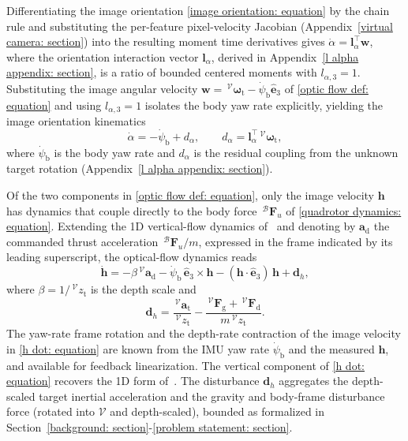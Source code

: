 \documentclass{IEEEtaes}
\begin{document}
Differentiating the image orientation \eqref{image orientation: equation} by the chain rule and substituting the per-feature pixel-velocity Jacobian (Appendix~\ref{virtual camera: section}) into the resulting moment time derivatives gives $\dot{\alpha}=\boldsymbol{l}_\alpha^\top\boldsymbol{w}$, where the orientation interaction vector $\boldsymbol{l}_\alpha$, derived in Appendix~\ref{l alpha appendix: section}, is a ratio of bounded centered moments with $l_{\alpha,3}=1$. Substituting the image angular velocity $\boldsymbol{w} = \,^\mathcal{V}\boldsymbol{\omega}_\text{t} - \dot{\psi}_\text{b}\hat{\boldsymbol{e}}_3$ of \eqref{optic flow def: equation} and using $l_{\alpha,3}=1$ isolates the body yaw rate explicitly, yielding the image orientation kinematics
\begin{equation} \label{alpha dot: equation}
    \dot{\alpha} = - \dot{\psi}_\text{b} + d_{\alpha},\qquad d_\alpha = \boldsymbol{l}_\alpha^\top\,^\mathcal{V}\boldsymbol{\omega}_\text{t},
\end{equation}
where $\dot{\psi}_\text{b}$ is the body yaw rate and $d_{\alpha}$ is the residual coupling from the unknown target rotation (Appendix~\ref{l alpha appendix: section}).

Of the two components in \eqref{optic flow def: equation}, only the image velocity $\boldsymbol{h}$ has dynamics that couple directly to the body force $\,^\mathcal{B}\boldsymbol{F}_u$ of \eqref{quadrotor dynamics: equation}. Extending the 1D vertical-flow dynamics of~\cite{singhal2025} and denoting by $\boldsymbol{a}_\text{d}$ the commanded thrust acceleration $\,^\mathcal{B}\boldsymbol{F}_u/m$, expressed in the frame indicated by its leading superscript, the optical-flow dynamics reads
\begin{equation} \label{h dot: equation}
    \dot{\boldsymbol{h}} = -\beta\,^\mathcal{V}\boldsymbol{a}_\text{d} - \dot{\psi}_\text{b}\,\hat{\boldsymbol{e}}_3\times\boldsymbol{h} - (\boldsymbol{h}\cdot\hat{\boldsymbol{e}}_3)\,\boldsymbol{h} + \boldsymbol{d}_h,
\end{equation}
where $\beta = 1/\,^\mathcal{V}z_\text{t}$ is the depth scale and
\begin{equation} \label{d h: equation}
\boldsymbol{d}_h = \frac{\,^\mathcal{V}\boldsymbol{a}_\text{t}}{\,^\mathcal{V}z_\text{t}} - \frac{\,^\mathcal{V}\boldsymbol{F}_\text{g}+\,^\mathcal{V}\boldsymbol{F}_\text{d}}{m\,^\mathcal{V}z_\text{t}}.
\end{equation}
The yaw-rate frame rotation and the depth-rate contraction of the image velocity in \eqref{h dot: equation} are known from the IMU yaw rate $\dot{\psi}_\text{b}$ and the measured $\boldsymbol{h}$, and available for feedback linearization. The vertical component of \eqref{h dot: equation} recovers the 1D form of~\cite{singhal2025}. The disturbance $\boldsymbol{d}_h$ aggregates the depth-scaled target inertial acceleration and the gravity and body-frame disturbance force (rotated into $\mathcal{V}$ and depth-scaled), bounded as formalized in Section~\ref{background: section}-\ref{problem statement: section}.
\end{document}
